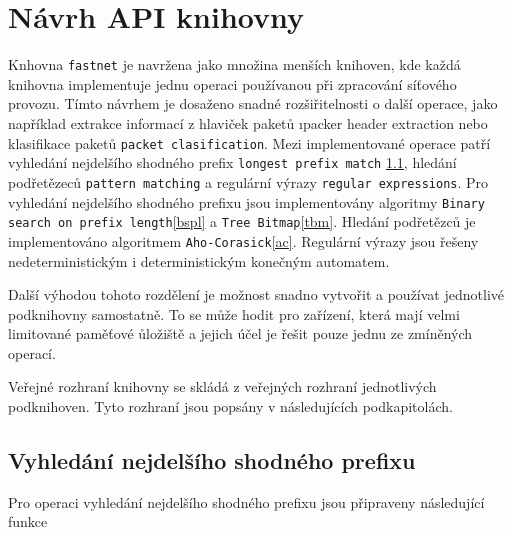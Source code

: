 \chapter{Návrh API knihovny}\label{chapter:api}
Knhovna \texttt{fastnet} je navržena jako množina menších knihoven, kde každá knihovna implementuje
jednu operaci používanou při zpracování síťového provozu.
Tímto návrhem je dosaženo snadné rozšiřitelnosti o další operace, jako například extrakce informací z hlaviček paketů
\i{packer header extraction} nebo klasifikace paketů \texttt{packet clasification}.
Mezi implementované operace patří vyhledání nejdelšího shodného prefix \texttt{longest prefix match} \ref{},
hledání podřetězeců \texttt{pattern matching} a regulární výrazy \texttt{regular expressions}.
Pro vyhledání nejdelšího shodného prefixu jsou implementovány algoritmy
\texttt{Binary search on prefix length}\ref{bspl} a \texttt{Tree Bitmap}\ref{tbm}.
Hledání podřetězců je implementováno algoritmem \texttt{Aho-Corasick}\ref{ac}.
Regulární výrazy jsou řešeny nedeterministickým i deterministickým konečným automatem.

Další výhodou tohoto rozdělení je možnost snadno vytvořit a používat jednotlivé podknihovny samostatně.
To se může hodit pro zařízení, která mají velmi limitované paměťové ůložiště a jejich účel
je řešit pouze jednu ze zmíněných operací.

Veřejné rozhraní knihovny se skládá z veřejných rozhraní jednotlivých podknihoven.
Tyto rozhraní jsou popsány v následujících podkapitolách.

\section{Vyhledání nejdelšího shodného prefixu}
Pro operaci vyhledání nejdelšího shodného prefixu jsou připraveny následující funkce

